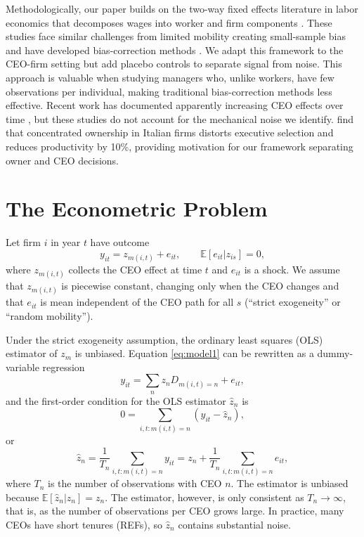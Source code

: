 \documentclass[11pt,a4paper]{article}
\begin{document}
Methodologically, our paper builds on the two-way fixed effects literature in labor economics that decomposes wages into worker and firm components \citep{Abowd1999Econometrica, Card2018JoLE}. These studies face similar challenges from limited mobility creating small-sample bias \citep{andrews2008high} and have developed bias-correction methods \citep{Bonhomme2023-dx, gaure2014correlation}. We adapt this framework to the CEO-firm setting but add placebo controls to separate signal from noise. This approach is valuable when studying managers who, unlike workers, have few observations per individual, making traditional bias-correction methods less effective. Recent work has documented apparently increasing CEO effects over time \citep{quigley2015has}, but these studies do not account for the mechanical noise we identify. \citet{lippi2014corporate} find that concentrated ownership in Italian firms distorts executive selection and reduces productivity by 10\%, providing motivation for our framework separating owner and CEO decisions.

\section{The Econometric Problem}

Let firm $i$ in year $t$ have outcome
\begin{equation}\label{eq:model1}
  y_{it} = z_{m(i,t)} + e_{it},\qquad \mathbb E[e_{it}|z_{is}]=0,
\end{equation}
where $z_{m(i,t)}$ collects the CEO effect at time $t$ and $e_{it}$ is a shock. We assume that $z_{m(i,t)}$ is piecewise constant, changing only when the CEO changes and that $e_{it}$ is mean independent of the CEO path for all $s$ (``strict exogeneity'' or ``random mobility'').

Under the strict exogeneity assumption, the ordinary least squares (OLS) estimator of $z_m$ is unbiased. Equation \eqref{eq:model1} can be rewritten as a dummy-variable regression 
$$
y_{it} = \sum_{n} z_n D_{m(i,t)=n}  + e_{it},
$$
and the first-order condition for the OLS estimator $\hat z_n$ is
$$
0 = \sum_{i,t:m(i,t)=n} (y_{it} - \hat z_n),
$$
or 
$$
\hat z_n = \frac{1}{T_n} \sum_{i,t:m(i,t)=n} y_{it} = z_n + \frac{1}{T_n} \sum_{i,t:m(i,t)=n} e_{it},
$$
where $T_n$ is the number of observations with CEO $n$. The estimator is unbiased because $\mathbb E[\hat z_n|z_n] = z_n$. The estimator, however, is only consistent as $T_n\to\infty$, that is, as the number of observations per CEO grows large. In practice, many CEOs have short tenures (REFs), so $\hat z_n$ contains substantial noise. 
\end{document}
